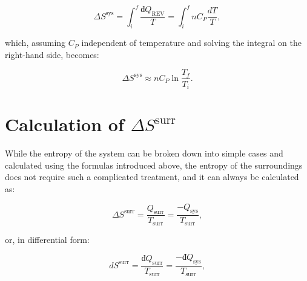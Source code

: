 \documentclass[
  9pt,
]{extbook}
\theoremstyle{definition}
\theoremstyle{definition}
\theoremstyle{definition}
\theoremstyle{remark}
\begin{document}
\begin{equation}
\Delta S^{\mathrm{sys}} = \int_i^f \frac{đQ_{\mathrm{REV}}}{T} = \int_i^f nC_P \frac{dT}{T},
\label{eq:sconstP1}
\end{equation}

which, assuming \(C_P\) independent of temperature and solving the integral on the right-hand side, becomes:

\begin{equation}
\Delta S^{\mathrm{sys}} \approx n C_P \ln \frac{T_f}{T_i}.
\label{eq:sconstP}
\end{equation}

\hypertarget{dssurr}{%
\section{\texorpdfstring{Calculation of \(\Delta S^{\mathrm{surr}}\)}{Calculation of \textbackslash Delta S\^{}\{\textbackslash mathrm\{surr\}\}}}\label{dssurr}}

While the entropy of the system can be broken down into simple cases and calculated using the formulas introduced above, the entropy of the surroundings does not require such a complicated treatment, and it can always be calculated as:

\begin{equation}
\Delta S^{\mathrm{surr}} = \frac{Q_{\text{surr}}}{T_{\text{surr}}}=\frac{-Q_{\text{sys}}}{T_{\text{surr}}},
\label{eq:dssurr}
\end{equation}

or, in differential form:

\begin{equation}
d S^{\mathrm{surr}} = \frac{đQ_{\text{surr}}}{T_{\text{surr}}}=\frac{-đQ_{\text{sys}}}{T_{\text{surr}}},
\label{eq:dssurrd}
\end{equation}
\end{document}
